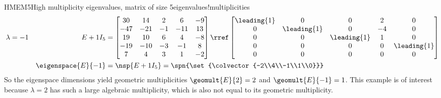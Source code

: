 \begin{example}{HMEM5}{High multiplicity eigenvalues, matrix of size 5}{eigenvalues!multiplicities}
\begin{align*}
%
\lambda&=-1&E+1I_5&=
\begin{bmatrix}
30 & 14 & 2 & 6 & -9\\ 
-47 & -21 & -1 & -11 & 13\\ 
19 & 10 & 6 & 4 & -8\\ 
-19 & -10 & -3 & -1 & 8\\ 
7 & 4 & 3 & 1 & -2
\end{bmatrix}
\rref
\begin{bmatrix}
\leading{1} & 0 & 0 & 2 & 0\\ 
0 & \leading{1} & 0 & -4 & 0\\ 
0 & 0 & \leading{1} & 1 & 0\\ 
0 & 0 & 0 & 0 & \leading{1}\\ 
0 & 0 & 0 & 0 & 0
\end{bmatrix}\\
&&\eigenspace{E}{-1}&=\nsp{E+1I_5}=\spn{\set{\colvector{-2\\4\\-1\\1\\0}}}\\
%
\end{align*}
%
So the eigenspace dimensions yield geometric multiplicities $\geomult{E}{2}=2$ and $\geomult{E}{-1}=1$.  This example is of interest because $\lambda=2$ has such a large algebraic multiplicity, which is also not equal to its geometric multiplicity.
%
\end{example}
%
